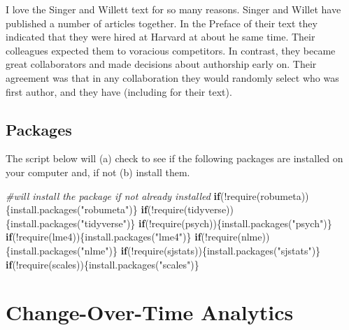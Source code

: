 \documentclass[
  11pt,
]{book}
\newenvironment{Shaded}{\begin{snugshade}}{\end{snugshade}}
\newcommand{\CommentTok}[1]{\textcolor[rgb]{0.56,0.35,0.01}{\textit{#1}}}
\newcommand{\ControlFlowTok}[1]{\textcolor[rgb]{0.13,0.29,0.53}{\textbf{#1}}}
\newcommand{\FunctionTok}[1]{\textcolor[rgb]{0.00,0.00,0.00}{#1}}
\newcommand{\NormalTok}[1]{#1}
\newcommand{\SpecialCharTok}[1]{\textcolor[rgb]{0.00,0.00,0.00}{#1}}
\newcommand{\StringTok}[1]{\textcolor[rgb]{0.31,0.60,0.02}{#1}}
\begin{document}
I love the Singer and Willett \citeyearpar{singer_applied_2003} text for so many reasons. Singer and Willet have published a number of articles together. In the Preface of their text they indicated that they were hired at Harvard at about he same time. Their colleagues expected them to voracious competitors. In contrast, they became great collaborators and made decisions about authorship early on. Their agreement was that in any collaboration they would randomly select who was first author, and they have (including for their text).

\hypertarget{packages-2}{%
\subsection{Packages}\label{packages-2}}

The script below will (a) check to see if the following packages are installed on your computer and, if not (b) install them.

\begin{Shaded}
\begin{Highlighting}[]
\CommentTok{\#will install the package if not already installed}
\ControlFlowTok{if}\NormalTok{(}\SpecialCharTok{!}\FunctionTok{require}\NormalTok{(robumeta))\{}\FunctionTok{install.packages}\NormalTok{(}\StringTok{"robumeta"}\NormalTok{)\}}
\ControlFlowTok{if}\NormalTok{(}\SpecialCharTok{!}\FunctionTok{require}\NormalTok{(tidyverse))\{}\FunctionTok{install.packages}\NormalTok{(}\StringTok{"tidyverse"}\NormalTok{)\}}
\ControlFlowTok{if}\NormalTok{(}\SpecialCharTok{!}\FunctionTok{require}\NormalTok{(psych))\{}\FunctionTok{install.packages}\NormalTok{(}\StringTok{"psych"}\NormalTok{)\}}
\ControlFlowTok{if}\NormalTok{(}\SpecialCharTok{!}\FunctionTok{require}\NormalTok{(lme4))\{}\FunctionTok{install.packages}\NormalTok{(}\StringTok{"lme4"}\NormalTok{)\}}
\ControlFlowTok{if}\NormalTok{(}\SpecialCharTok{!}\FunctionTok{require}\NormalTok{(nlme))\{}\FunctionTok{install.packages}\NormalTok{(}\StringTok{"nlme"}\NormalTok{)\}}
\ControlFlowTok{if}\NormalTok{(}\SpecialCharTok{!}\FunctionTok{require}\NormalTok{(sjstats))\{}\FunctionTok{install.packages}\NormalTok{(}\StringTok{"sjstats"}\NormalTok{)\}}
\ControlFlowTok{if}\NormalTok{(}\SpecialCharTok{!}\FunctionTok{require}\NormalTok{(scales))\{}\FunctionTok{install.packages}\NormalTok{(}\StringTok{"scales"}\NormalTok{)\}}
\end{Highlighting}
\end{Shaded}

\hypertarget{change-over-time-analytics}{%
\section{Change-Over-Time Analytics}\label{change-over-time-analytics}}
\end{document}
